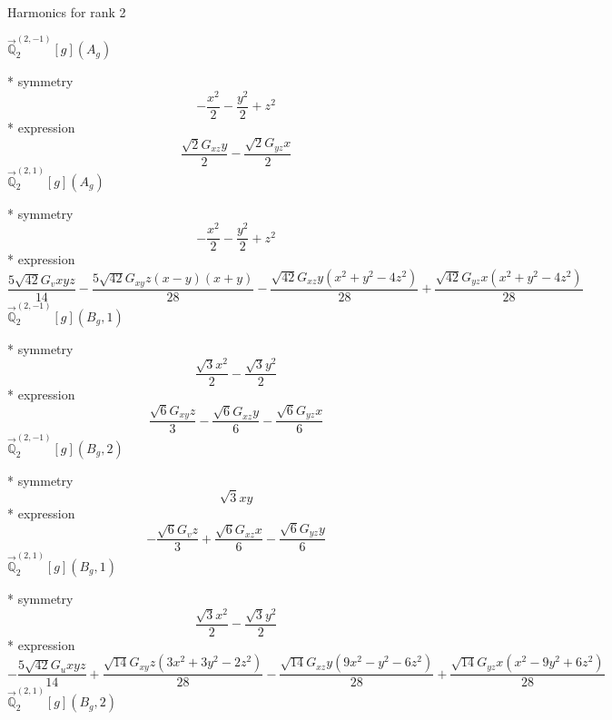\documentclass[fleqn,8pt]{jsarticle}
\begin{document}
\noindent * Harmonics for rank 2

\noindent\quad $\vec{\mathbb{Q}}_{2}^{(2,-1)}[g](A_{g})$

\noindent\quad ** symmetry
\begin{dmath*}
- \frac{x^{2}}{2} - \frac{y^{2}}{2} + z^{2}
\end{dmath*}
\noindent\quad ** expression
\begin{dmath*}
\frac{\sqrt{2} G_{xz} y}{2} - \frac{\sqrt{2} G_{yz} x}{2}
\end{dmath*}
\noindent\quad $\vec{\mathbb{Q}}_{2}^{(2,1)}[g](A_{g})$

\noindent\quad ** symmetry
\begin{dmath*}
- \frac{x^{2}}{2} - \frac{y^{2}}{2} + z^{2}
\end{dmath*}
\noindent\quad ** expression
\begin{dmath*}
\frac{5 \sqrt{42} G_{v} x y z}{14} - \frac{5 \sqrt{42} G_{xy} z \left(x - y\right) \left(x + y\right)}{28} - \frac{\sqrt{42} G_{xz} y \left(x^{2} + y^{2} - 4 z^{2}\right)}{28} + \frac{\sqrt{42} G_{yz} x \left(x^{2} + y^{2} - 4 z^{2}\right)}{28}
\end{dmath*}
\noindent\quad $\vec{\mathbb{Q}}_{2}^{(2,-1)}[g](B_{g},1)$

\noindent\quad ** symmetry
\begin{dmath*}
\frac{\sqrt{3} x^{2}}{2} - \frac{\sqrt{3} y^{2}}{2}
\end{dmath*}
\noindent\quad ** expression
\begin{dmath*}
\frac{\sqrt{6} G_{xy} z}{3} - \frac{\sqrt{6} G_{xz} y}{6} - \frac{\sqrt{6} G_{yz} x}{6}
\end{dmath*}
\noindent\quad $\vec{\mathbb{Q}}_{2}^{(2,-1)}[g](B_{g},2)$

\noindent\quad ** symmetry
\begin{dmath*}
\sqrt{3} x y
\end{dmath*}
\noindent\quad ** expression
\begin{dmath*}
- \frac{\sqrt{6} G_{v} z}{3} + \frac{\sqrt{6} G_{xz} x}{6} - \frac{\sqrt{6} G_{yz} y}{6}
\end{dmath*}
\noindent\quad $\vec{\mathbb{Q}}_{2}^{(2,1)}[g](B_{g},1)$

\noindent\quad ** symmetry
\begin{dmath*}
\frac{\sqrt{3} x^{2}}{2} - \frac{\sqrt{3} y^{2}}{2}
\end{dmath*}
\noindent\quad ** expression
\begin{dmath*}
- \frac{5 \sqrt{42} G_{u} x y z}{14} + \frac{\sqrt{14} G_{xy} z \left(3 x^{2} + 3 y^{2} - 2 z^{2}\right)}{28} - \frac{\sqrt{14} G_{xz} y \left(9 x^{2} - y^{2} - 6 z^{2}\right)}{28} + \frac{\sqrt{14} G_{yz} x \left(x^{2} - 9 y^{2} + 6 z^{2}\right)}{28}
\end{dmath*}
\noindent\quad $\vec{\mathbb{Q}}_{2}^{(2,1)}[g](B_{g},2)$
\end{document}
